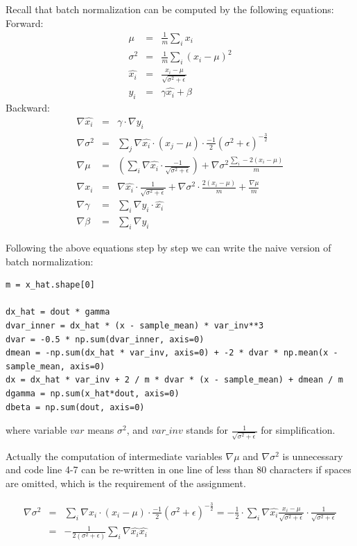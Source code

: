 \documentclass{article} %
\begin{document}
Recall that batch normalization can be computed by the following equations:
Forward:
\begin{eqnarray*}
	\mu &=& \frac{1}{m} \sum_i x_i\\
	\sigma^2 &=& \frac{1}{m}\sum_i (x_i-\mu)^2\\
	\hat{x_i} &=& \frac{x_i-\mu}{\sqrt{\sigma^2+\epsilon}}\\
	y_i &=& \gamma \hat{x_i} + \beta
\end{eqnarray*}
Backward:
\begin{eqnarray*}
	\nabla \hat{x_i} &=& \gamma \cdot \nabla y_i\\
	\nabla \sigma^2 &=& \sum_j \nabla \hat{x_i} \cdot (x_j - \mu) \cdot \frac{-1}{2} (\sigma^2 + \epsilon)^{-\frac{3}{2}}\\
	\nabla \mu &=& \left(\sum_i \nabla \hat{x_i} \cdot \frac{-1}{\sqrt{\sigma^2+\epsilon}}\right) + \nabla{\sigma^2} \frac{\sum_i -2(x_i-\mu)}{m}\\
	\nabla x_i &=& \nabla \hat{x_i} \cdot \frac{1}{\sqrt{\sigma^2 + \epsilon}} + \nabla \sigma^2 \cdot \frac{2(x_i-\mu)}{m} + \frac{\nabla{\mu}}{m}\\
	\nabla \gamma &=& \sum_i \nabla y_i \cdot \hat{x_i}\\
	\nabla \beta &=& \sum_i \nabla y_i
\end{eqnarray*}

Following the above equations step by step we can write the naive version of batch normalization:
\begin{lstlisting}
m = x_hat.shape[0]

dx_hat = dout * gamma
dvar_inner = dx_hat * (x - sample_mean) * var_inv**3
dvar = -0.5 * np.sum(dvar_inner, axis=0)
dmean = -np.sum(dx_hat * var_inv, axis=0) + -2 * dvar * np.mean(x - sample_mean, axis=0)
dx = dx_hat * var_inv + 2 / m * dvar * (x - sample_mean) + dmean / m
dgamma = np.sum(x_hat*dout, axis=0)
dbeta = np.sum(dout, axis=0)
\end{lstlisting}
where variable $var$ means $\sigma^2$, and $var\_inv$ stands for $\frac{1}{\sqrt{\sigma^2+\epsilon}}$ for simplification.

Actually the computation of intermediate variables $\nabla \mu$ and $\nabla \sigma^2$ is unnecessary and code line 4-7 can be re-written in one line of less than 80 characters if spaces are omitted, which is the requirement of the assignment.

\begin{eqnarray*}
\nabla \sigma^2 &=& \sum_i \nabla \hat{x_i} \cdot (x_i - \mu) \cdot \frac{-1}{2} (\sigma^2 + \epsilon)^{-\frac{3}{2}} = -\frac{1}{2} \cdot \sum_i \nabla \hat{x_i} \frac{x_i-\mu}{\sqrt{\sigma^2+\epsilon}} \cdot \frac{1}{\sqrt{\sigma^2+\epsilon}}\\
&=& -\frac{1}{2(\sigma^2+\epsilon)} \sum_i \nabla \hat{x_i} \hat{x_i}
\end{eqnarray*}
\end{document}
